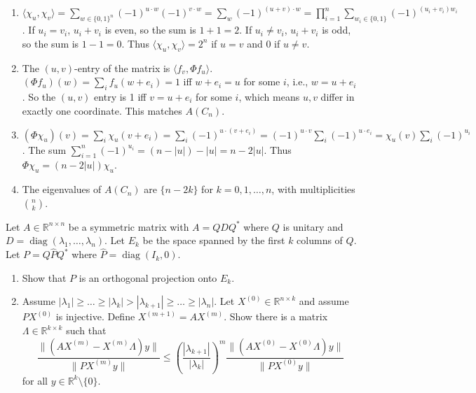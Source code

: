 \begin{solution}
\begin{enumerate}
    \item $\langle \chi_u, \chi_v \rangle = \sum_{w \in \{0,1\}^n} (-1)^{u \cdot w} (-1)^{v \cdot w} = \sum_{w} (-1)^{(u+v) \cdot w} = \prod_{i=1}^n \sum_{w_i \in \{0,1\}} (-1)^{(u_i+v_i)w_i}$.
    If $u_i = v_i$, $u_i+v_i$ is even, so the sum is $1+1=2$. If $u_i \neq v_i$, $u_i+v_i$ is odd, so the sum is $1-1=0$.
    Thus $\langle \chi_u, \chi_v \rangle = 2^n$ if $u=v$ and $0$ if $u \neq v$.
    \item The $(u,v)$-entry of the matrix is $\langle f_v, \Phi f_u \rangle$. $(\Phi f_u)(w) = \sum_i f_u(w+e_i) = 1$ iff $w+e_i = u$ for some $i$, i.e., $w = u+e_i$.
    So the $(u,v)$ entry is 1 iff $v = u+e_i$ for some $i$, which means $u, v$ differ in exactly one coordinate. This matches $A(C_n)$.
    \item $(\Phi \chi_u)(v) = \sum_i \chi_u(v+e_i) = \sum_i (-1)^{u \cdot (v+e_i)} = (-1)^{u \cdot v} \sum_i (-1)^{u \cdot e_i} = \chi_u(v) \sum_i (-1)^{u_i}$.
    The sum $\sum_{i=1}^n (-1)^{u_i} = (n - |u|) - |u| = n - 2|u|$. Thus $\Phi \chi_u = (n-2|u|) \chi_u$.
    \item The eigenvalues of $A(C_n)$ are $\{n-2k\}$ for $k=0, 1, \dots, n$, with multiplicities $\binom{n}{k}$.
\end{enumerate}
\end{solution}

\begin{exercise}
\label{applied:2018:8}
Let $A \in \mathbb{R}^{n \times n}$ be a symmetric matrix with $A = QDQ^*$ where $Q$ is unitary and $D = \operatorname{diag}(\lambda_1, \dots, \lambda_n)$. Let $E_k$ be the space spanned by the first $k$ columns of $Q$. Let $P = Q \hat{P} Q^*$ where $\hat{P} = \operatorname{diag}(I_k, 0)$.
\begin{enumerate}
    \item Show that $P$ is an orthogonal projection onto $E_k$.
    \item Assume $|\lambda_1| \geq \dots \geq |\lambda_k| > |\lambda_{k+1}| \geq \dots \geq |\lambda_n|$. Let $X^{(0)} \in \mathbb{R}^{n \times k}$ and assume $PX^{(0)}$ is injective. Define $X^{(m+1)} = AX^{(m)}$. Show there is a matrix $\Lambda \in \mathbb{R}^{k \times k}$ such that
    \[
    \frac{\| (AX^{(m)} - X^{(m)} \Lambda) y \|}{\| PX^{(m)} y \|} \leq \left(\frac{|\lambda_{k+1}|}{|\lambda_k|}\right)^m \frac{\| (AX^{(0)} - X^{(0)} \Lambda) y \|}{\| PX^{ (0)} y \|}
    \]
    for all $y \in \mathbb{R}^k \setminus \{0\}$.
\end{enumerate}
\end{exercise}

